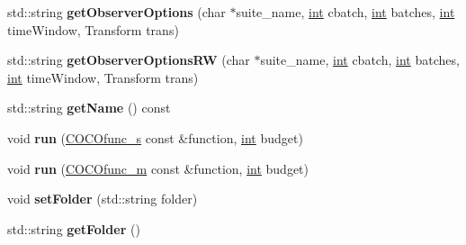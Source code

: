 \begin{DoxyCompactItemize}
\item 
std\+::string {\bfseries get\+Observer\+Options} (char $\ast$suite\+\_\+name, \hyperlink{classint}{int} cbatch, \hyperlink{classint}{int} batches, \hyperlink{classint}{int} time\+Window, Transform trans)\hypertarget{classCocoOptimiser_ad9591d2b76f7078a956e7cdca1d8ba60}{}\label{classCocoOptimiser_ad9591d2b76f7078a956e7cdca1d8ba60}

\item 
std\+::string {\bfseries get\+Observer\+Options\+RW} (char $\ast$suite\+\_\+name, \hyperlink{classint}{int} cbatch, \hyperlink{classint}{int} batches, \hyperlink{classint}{int} time\+Window, Transform trans)\hypertarget{classCocoOptimiser_afc334f80b0aee491d2452f7f89402d17}{}\label{classCocoOptimiser_afc334f80b0aee491d2452f7f89402d17}

\item 
std\+::string {\bfseries get\+Name} () const \hypertarget{classCocoOptimiser_a265bd5d524ea5b10d5e9f4028cdc386c}{}\label{classCocoOptimiser_a265bd5d524ea5b10d5e9f4028cdc386c}

\item 
void {\bfseries run} (\hyperlink{classCOCOfunc__s}{C\+O\+C\+Ofunc\+\_\+s} const \&function, \hyperlink{classint}{int} budget)\hypertarget{classCocoOptimiser_a5842d02046cb097f0e11c84329f32799}{}\label{classCocoOptimiser_a5842d02046cb097f0e11c84329f32799}

\item 
void {\bfseries run} (\hyperlink{classCOCOfunc__m}{C\+O\+C\+Ofunc\+\_\+m} const \&function, \hyperlink{classint}{int} budget)\hypertarget{classCocoOptimiser_a1ad475649fa2f85129a8db7457cffeab}{}\label{classCocoOptimiser_a1ad475649fa2f85129a8db7457cffeab}

\item 
void {\bfseries set\+Folder} (std\+::string folder)\hypertarget{classCocoOptimiser_a2bfb5ff0b5420e95c6736070d4853eea}{}\label{classCocoOptimiser_a2bfb5ff0b5420e95c6736070d4853eea}

\item 
std\+::string {\bfseries get\+Folder} ()\hypertarget{classCocoOptimiser_aedb7b8bd6951c363b3ecbeb878cd0539}{}\label{classCocoOptimiser_aedb7b8bd6951c363b3ecbeb878cd0539}

\end{DoxyCompactItemize}
